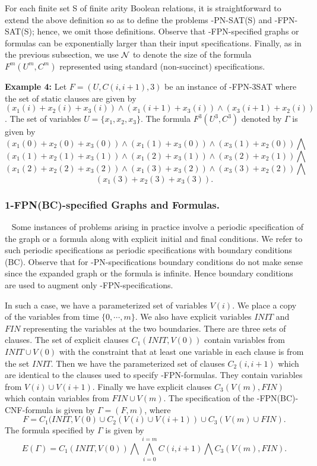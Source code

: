 For each finite set {\sf S} of finite arity Boolean relations, 
it is straightforward to extend the above 
definition so as to define the problems {-PN-SAT(S)}  
and {-FPN-SAT(S)};  hence, we omit those
definitions.  Observe that 
{-FPN}-specified graphs or formulas can be exponentially larger 
than their input specifications. Finally, as in the previous subsection, 
we use ${\cal N}$ to denote the size of the formula $F^m(U^m, C^m)$ represented
using standard (non-succinct) specifications.

\smallskip
	 
\noindent
{\bf Example 4:}
Let $F= (U,C(i, i+1),3)$ be an instance of  {-FPN-3SAT} 
where the set of static clauses are given by
$(x_1(i) + x_2(i) + x_3(i) )  \wedge 
(x_1(i+1) + x_3(i)) \wedge (x_3(i+1) + x_2(i))$.
The set of variables $U = \{ x_1, x_2, x_3 \}$.
The formula $F^3(U^3,C^3)$ denoted by $\Gamma$ is given by 
\[(x_1(0) + x_2(0) + x_3(0)) \wedge (x_1(1) + x_3(0)) \wedge (x_3(1) + x_2(0)) 
\bigwedge \]
\[(x_1(1) + x_2(1) + x_3(1)) \wedge (x_1(2) + x_3(1)) \wedge (x_3(2) + x_2(1)) 
\bigwedge \]
\[(x_1(2) + x_2(2) + x_3(2)) \wedge (x_1(3) + x_3(2)) \wedge (x_3(3) + x_2(2)) 
\bigwedge \]
\[(x_1(3) + x_2(3) + x_3(3)).\] \hfill\QED



\subsubsection{1-FPN(BC)-specified Graphs and Formulas.}~
Some instances of problems arising in practice involve a periodic specification
of the graph or a formula along with explicit initial and final conditions.
We refer to such periodic specifications as periodic specifications with boundary
conditions ({\sf BC}). 
Observe that for {-PN}-specifications boundary conditions
do not make sense since the expanded graph or the formula is infinite.
Hence boundary conditions are used to augment only {-FPN}-specifications.

In such a case, we have a parameterized set of variables $V(i)$.
We place a copy of the variables from time $\{ 0, \cdots, m \}$.
We also have explicit variables $INIT$ and $FIN$ 
representing the variables at the
two boundaries. There are three sets of clauses.
The set of explicit clauses $C_1(INIT, V(0))$ contain variables from 
$INIT \cup V(0)$  with the constraint that at least one variable in each clause
is from the set $INIT$. Then we have the parameterized set of clauses
$C_2(i, i+1)$ which are identical to the clauses used to specify 
{-FPN}-formulas. They contain variables from $V(i) \cup V(i+1)$.
Finally we have explicit clauses $C_3(V(m), FIN)$ which contain variables from
$FIN \cup V(m)$. 
The specification of the {-FPN(BC)-CNF}-formula is given by
$\Gamma = ( F, m)$, where 
\[F = C_1(INIT, V(0) \cup C_2(V(i) \cup V(i+1)) \cup C_3(V(m) \cup FIN). \]
The formula specified by $\Gamma$ is given by 
\[E(\Gamma) =  
C_1(INIT, V(0)) \bigwedge \bigwedge_{i = 0}^{ i = m} C(i, i+1) \bigwedge 
C_3(V(m), FIN).  \]
